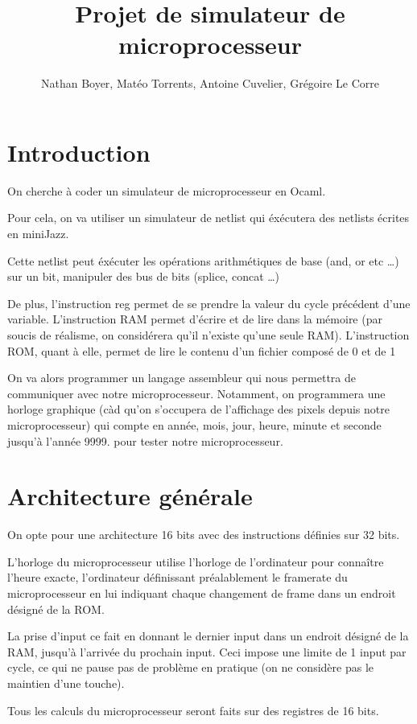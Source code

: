 \documentclass[12pt,a4paper,french]{article}
\title{Projet de simulateur de microprocesseur}
\author{Nathan Boyer, Matéo Torrents, Antoine Cuvelier, Grégoire Le Corre}
\begin{document}
\maketitle

\section*{Introduction}

On cherche à coder un simulateur de microprocesseur en Ocaml.

Pour cela, on va utiliser un simulateur de netlist qui éxécutera des netlists écrites en miniJazz.

Cette netlist peut éxécuter les opérations arithmétiques de base (and, or etc \ldots) sur un bit, manipuler des bus de bits (splice, concat \ldots)

De plus, l'instruction reg permet de se prendre la valeur du cycle précédent d'une variable. L'instruction RAM permet d'écrire et de lire dans la mémoire
(par soucis de réalisme, on considérera qu'il n'existe qu'une seule RAM). L'instruction ROM, quant à elle, permet de lire le contenu d'un fichier composé de 0 et de 1

On va alors programmer un langage assembleur qui nous permettra de communiquer avec notre microprocesseur. Notamment, on programmera une horloge graphique (càd qu'on s'occupera
de l'affichage des pixels depuis notre microprocesseur) qui compte en année, mois, jour, heure, minute et seconde jusqu'à l'année 9999.
pour tester notre microprocesseur.


\section{Architecture générale}

On opte pour une architecture 16 bits avec des instructions définies sur 32 bits.

L'horloge du microprocesseur utilise l'horloge de l'ordinateur pour connaître l'heure exacte, l'ordinateur définissant préalablement le framerate du microprocesseur en lui indiquant chaque changement de frame dans un endroit désigné de la ROM.

La prise d'input ce fait en donnant le dernier input dans un endroit désigné de la RAM, jusqu'à l'arrivée du prochain input. Ceci impose une limite de 1 input par cycle, ce qui ne pause pas de problème en pratique (on ne considère pas le maintien d'une touche).

Tous les calculs du microprocesseur seront faits sur des registres de 16 bits.
\end{document}
